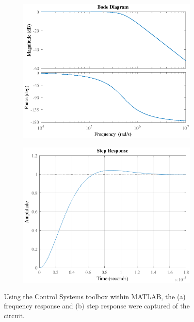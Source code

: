 \documentclass{report}
\begin{document}
\begin{figure}[H]
	\centering
	\begin{subfigure}{0.4\textwidth}
		\centering
		\includegraphics[width=\linewidth]{exp2_matlab_bode}
		\caption{}
	\end{subfigure}
	\begin{subfigure}{0.4\textwidth}
		\centering
		\includegraphics[width=\linewidth]{exp2_matlab_step}
		\caption{}
	\end{subfigure}
	\caption{Using the Control Systems toolbox within MATLAB, the (a) frequency response and (b) step response were captured of the circuit.}
	\label{fig:exp2_matlab}	
\end{figure}
\end{document}
